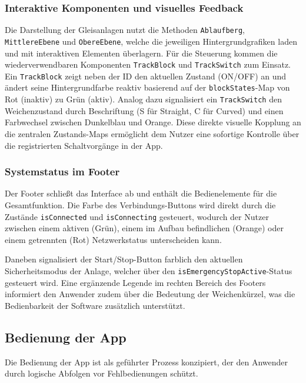 \documentclass{article}
\begin{document}
\subsubsection{Interaktive Komponenten und visuelles Feedback}
Die Darstellung der Gleisanlagen nutzt die Methoden \texttt{Ablauf\-berg}, \texttt{Mittlere\-Ebene} und \texttt{Obere\-Ebene}, welche die jeweiligen Hintergrundgrafiken laden und mit interaktiven Elementen überlagern. Für die Steuerung kommen die wiederverwendbaren Komponenten \texttt{Track\-Block} und \texttt{Track\-Switch} zum Einsatz. Ein \texttt{Track\-Block} zeigt neben der ID den aktuellen Zustand (ON/OFF) an und ändert seine Hintergrundfarbe reaktiv basierend auf der \texttt{block\-States}-Map von Rot (inaktiv) zu Grün (aktiv). Analog dazu signalisiert ein \texttt{Track\-Switch} den Weichenzustand durch Beschriftung (S für Straight, C für Curved) und einen Farbwechsel zwischen Dunkelblau und Orange. Diese direkte visuelle Kopplung an die zentralen Zustands-Maps ermöglicht dem Nutzer eine sofortige Kontrolle über die registrierten Schaltvorgänge in der App.

\subsubsection{Systemstatus im Footer}
Der Footer schließt das Interface ab und enthält die Bedienelemente für die Gesamtfunktion. Die Farbe des Verbindungs-Buttons wird direkt durch die Zustände \texttt{is\-Connected} und \texttt{is\-Connecting} gesteuert, wodurch der Nutzer zwischen einem aktiven (Grün), einem im Aufbau befindlichen (Orange) oder einem getrennten (Rot) Netzwerkstatus unterscheiden kann. 

Daneben signalisiert der Start/Stop-Button farblich den aktuellen Sicherheitsmodus der Anlage, welcher über den \texttt{is\-Emergency\-Stop\-Active}-Status gesteuert wird. Eine ergänzende Legende im rechten Bereich des Footers informiert den Anwender zudem über die Bedeutung der Weichenkürzel, was die Bedienbarkeit der Software zusätzlich unterstützt.



\subsection{Bedienung der App}
Die Bedienung der App ist als geführter Prozess konzipiert, der den Anwender durch logische Abfolgen vor Fehlbedienungen schützt.
\end{document}
